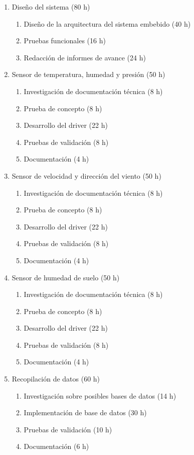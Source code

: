 \documentclass[
11pt, %
]{charter}
\begin{document}
\begin{enumerate}

\item Diseño del sistema (80 h)
	\begin{enumerate}
	\item Diseño de la arquitectura del sistema embebido (40 h)
	\item Pruebas funcionales (16 h)
	\item Redacción de informes de avance (24 h)
	\end{enumerate}

\item Sensor de temperatura, humedad y presión (50 h)
	\begin{enumerate}
	\item Investigación de documentación técnica (8 h)
	\item Prueba de concepto (8 h)
	\item Desarrollo del driver (22 h)
	\item Pruebas de validación (8 h)
	\item Documentación (4 h)
	\end{enumerate}
	
\item Sensor de velocidad y dirección del viento (50 h)
	\begin{enumerate}
	\item Investigación de documentación técnica (8 h)
	\item Prueba de concepto (8 h)
	\item Desarrollo del driver (22 h)
	\item Pruebas de validación (8 h)
	\item Documentación (4 h)
	\end{enumerate}
	
\item Sensor de humedad de suelo (50 h)
	\begin{enumerate}
	\item Investigación de documentación técnica (8 h)
	\item Prueba de concepto (8 h)
	\item Desarrollo del driver (22 h)
	\item Pruebas de validación (8 h)
	\item Documentación (4 h)
	\end{enumerate}
\newpage
\item Recopilación de datos (60 h)
	\begin{enumerate}
	\item Investigación sobre posibles bases de datos (14 h)
	\item Implementación de base de datos (30 h)
	\item Pruebas de validación (10 h)
	\item Documentación (6 h)
	\end{enumerate}


\end{enumerate}
\end{document}
